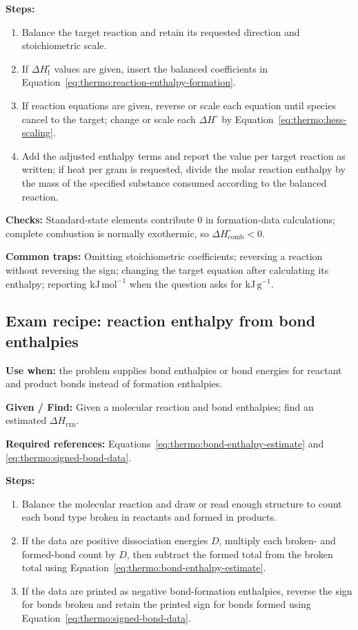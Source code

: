\textbf{Steps:}
\begin{enumerate}
    \item Balance the target reaction and retain its requested direction and stoichiometric scale.
    \item If \(\Delta H^\circ_{\mathrm f}\) values are given, insert the balanced coefficients in Equation~\eqref{eq:thermo:reaction-enthalpy-formation}.
    \item If reaction equations are given, reverse or scale each equation until species cancel to the target; change or scale each \(\Delta H^\circ\) by Equation~\eqref{eq:thermo:hess-scaling}.
    \item Add the adjusted enthalpy terms and report the value per target reaction as written; if heat per gram is requested, divide the molar reaction enthalpy by the mass of the specified substance consumed according to the balanced reaction.
\end{enumerate}

\textbf{Checks:} Standard-state elements contribute \(0\) in formation-data calculations; complete combustion is normally exothermic, so \(\Delta H^\circ_{\mathrm{comb}}<0\).

\textbf{Common traps:} Omitting stoichiometric coefficients; reversing a reaction without reversing the sign; changing the target equation after calculating its enthalpy; reporting \(\mathrm{kJ\,mol^{-1}}\) when the question asks for \(\mathrm{kJ\,g^{-1}}\).

\subsection{Exam recipe: reaction enthalpy from bond enthalpies}
\textbf{Use when:} the problem supplies bond enthalpies or bond energies for reactant and product bonds instead of formation enthalpies.

\textbf{Given / Find:} Given a molecular reaction and bond enthalpies; find an estimated \(\Delta H_{\mathrm{rxn}}\).

\textbf{Required references:} Equations~\eqref{eq:thermo:bond-enthalpy-estimate} and \eqref{eq:thermo:signed-bond-data}.

\textbf{Steps:}
\begin{enumerate}
    \item Balance the molecular reaction and draw or read enough structure to count each bond type broken in reactants and formed in products.
    \item If the data are positive dissociation energies \(D\), multiply each broken- and formed-bond count by \(D\), then subtract the formed total from the broken total using Equation~\eqref{eq:thermo:bond-enthalpy-estimate}.
    \item If the data are printed as negative bond-formation enthalpies, reverse the sign for bonds broken and retain the printed sign for bonds formed using Equation~\eqref{eq:thermo:signed-bond-data}.
\end{enumerate}

